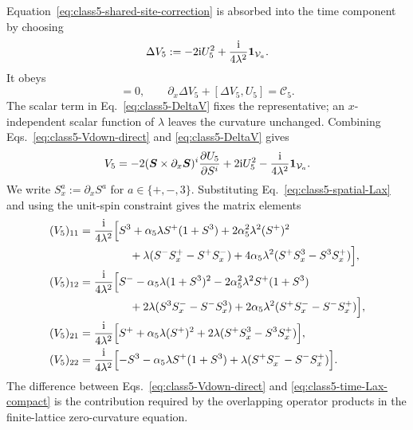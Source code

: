 Equation~\eqref{eq:class5-shared-site-correction} is absorbed into the time
component by choosing
\begin{equation}
\Delta V_5
:=
-2\mathrm{i} U_5^2+\frac{\mathrm{i}}{4\lambda^2}\mathbf{1}_{\mathcal V_a}.
\label{eq:class5-DeltaV}
\end{equation}
It obeys
\begin{equation}
[\Delta V_5,U_5]=0,
\qquad
\partial_x\Delta V_5+[\Delta V_5,U_5]=\mathcal C_5.
\label{eq:class5-DeltaV-absorbs-C}
\end{equation}
The scalar term in Eq.~\eqref{eq:class5-DeltaV} fixes the representative; an
$x$-independent scalar function of $\lambda$ leaves the curvature unchanged.
Combining Eqs.~\eqref{eq:class5-Vdown-direct} and
\eqref{eq:class5-DeltaV} gives
\begin{equation}
V_5
=
-2
(\boldsymbol S\times\partial_x\boldsymbol S)^i
\frac{\partial U_5}{\partial S^i}
+2\mathrm{i} U_5^2
-\frac{\mathrm{i}}{4\lambda^2}\mathbf{1}_{\mathcal V_a}.
\label{eq:class5-time-Lax-compact}
\end{equation}
We write $S_x^a:=\partial_x S^a$ for $a\in\{+,-,3\}$.  Substituting
Eq.~\eqref{eq:class5-spatial-Lax} and using the unit-spin constraint gives
the matrix elements
\begin{align}
(V_5)_{11}
={}&\frac{\mathrm{i}}{4\lambda^2}
\Bigl[
S^3+\alpha_5\lambda S^+(1+S^3)+2\alpha_5^2\lambda^2(S^+)^2
\nonumber\\
&\hspace{3.2em}
+\lambda(S^-S_x^+-S^+S_x^-)
+4\alpha_5\lambda^2(S^+S_x^3-S^3S_x^+)
\Bigr],
\label{eq:class5-time-Lax-11}\\
(V_5)_{12}
={}&\frac{\mathrm{i}}{4\lambda^2}
\Bigl[
S^- -\alpha_5\lambda(1+S^3)^2-2\alpha_5^2\lambda^2S^+(1+S^3)
\nonumber\\
&\hspace{3.2em}
+2\lambda(S^3S_x^--S^-S_x^3)
+2\alpha_5\lambda^2(S^+S_x^--S^-S_x^+)
\Bigr],
\label{eq:class5-time-Lax-12}\\
(V_5)_{21}
={}&\frac{\mathrm{i}}{4\lambda^2}
\Bigl[
S^+ +\alpha_5\lambda(S^+)^2
+2\lambda(S^+S_x^3-S^3S_x^+)
\Bigr],
\label{eq:class5-time-Lax-21}\\
(V_5)_{22}
={}&\frac{\mathrm{i}}{4\lambda^2}
\Bigl[
-S^3-\alpha_5\lambda S^+(1+S^3)
+\lambda(S^+S_x^--S^-S_x^+)
\Bigr].
\label{eq:class5-time-Lax-22}
\end{align}
The difference between Eqs.~\eqref{eq:class5-Vdown-direct} and
\eqref{eq:class5-time-Lax-compact} is the contribution required by the
overlapping operator products in the finite-lattice zero-curvature equation.
